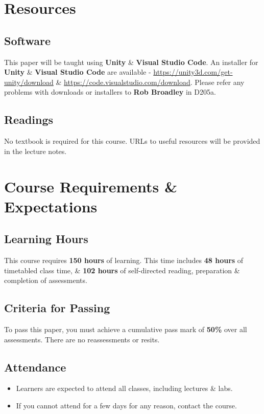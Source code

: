 \documentclass{article}
\begin{document}
\section*{Resources}

\subsection*{Software}
This paper will be taught using \textbf{Unity} \& \textbf{Visual Studio Code}. An installer for \textbf{Unity} \& \textbf{Visual Studio Code} are available - \href{https://unity3d.com/get-unity/download}{https://unity3d.com/get-unity/download} \& \href{https://code.visualstudio.com/download}{https://code.visualstudio.com/download}. Please refer any problems with downloads or installers to \textbf{Rob Broadley} in D205a.

\subsection*{Readings}
No textbook is required for this course. URLs to useful resources will be provided in the lecture notes.

\section*{Course Requirements \& Expectations}

\subsection*{Learning Hours}
This course requires \textbf{150 hours} of learning. This time includes \textbf{48 hours} of timetabled class time, \& \textbf{102 hours} of self-directed reading, preparation \& completion of assessments.

\subsection*{Criteria for Passing}
To pass this paper, you must achieve a cumulative pass mark of \textbf{50\%} over all assessments. There are no reassessments or resits.

\subsection*{Attendance}
\begin{itemize}
	\item Learners are expected to attend all classes, including lectures \& labs.
	\item If you cannot attend for a few days for any reason, contact the course.
\end{itemize}
\end{document}
